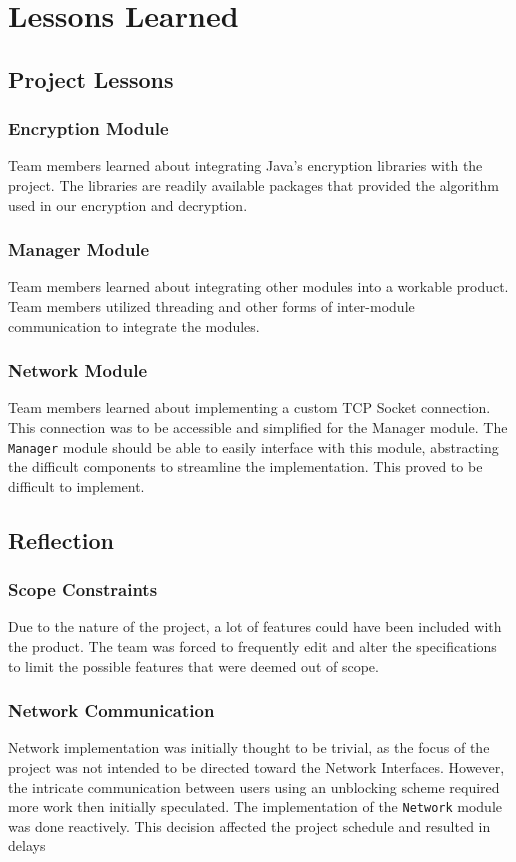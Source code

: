 \documentclass[sigconf]{acmart}
\begin{document}
\section{Lessons Learned}
\subsection{Project Lessons}
\subsubsection{Encryption Module}
Team members learned about integrating Java's encryption libraries with the
project. The libraries are readily available packages that provided the
algorithm used in our encryption and decryption.
\subsubsection{Manager Module}
Team members learned about integrating other modules into a workable product.
Team members utilized threading and other forms of inter-module communication
to integrate the modules.
\subsubsection{Network Module}
Team members learned about implementing a custom TCP Socket connection. This
connection was to be accessible and simplified for the Manager module. The
\texttt{Manager} module should be able to easily interface with this module,
abstracting the difficult components to streamline the implementation. This
proved to be difficult to implement.
\subsection{Reflection}
\subsubsection{Scope Constraints}
Due to the nature of the project, a lot of features could have been included
with the product. The team was forced to frequently edit and alter the
specifications to limit the possible features that were deemed out of scope.
\subsubsection{Network Communication}
Network implementation was initially thought to be trivial, as the focus of the
project was not intended to be directed toward the Network Interfaces. However,
the intricate communication between users using an unblocking scheme required
more work then initially speculated. The implementation of the \texttt{Network}
module was done reactively. This decision affected the project schedule and
resulted in delays
\end{document}
